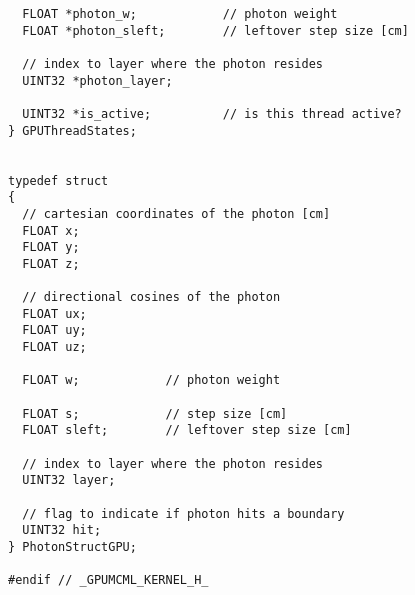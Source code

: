\begin{lstlisting}
  FLOAT *photon_w;            // photon weight
  FLOAT *photon_sleft;        // leftover step size [cm]

  // index to layer where the photon resides
  UINT32 *photon_layer;

  UINT32 *is_active;          // is this thread active?
} GPUThreadStates;


typedef struct
{
  // cartesian coordinates of the photon [cm]
  FLOAT x;
  FLOAT y;
  FLOAT z;

  // directional cosines of the photon
  FLOAT ux;
  FLOAT uy;
  FLOAT uz;

  FLOAT w;            // photon weight

  FLOAT s;            // step size [cm]
  FLOAT sleft;        // leftover step size [cm]

  // index to layer where the photon resides
  UINT32 layer;

  // flag to indicate if photon hits a boundary
  UINT32 hit;
} PhotonStructGPU;

#endif // _GPUMCML_KERNEL_H_

\end{lstlisting}



